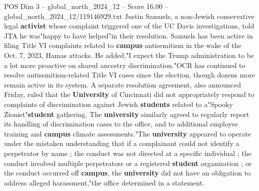 \begin{textsample}{POS Dim 3 – global\_north\_2024\_12 – Score 16.00 – global\_north\_2024\_12/119146929.txt}
Justin Samuels, a non-Jewish conservative legal \textbf{activist} whose complaint triggered one of the UC Davis investigations, told JTA he was"happy to have helped"in their resolution.
Samuels has been active in filing Title VI complaints related to \textbf{campus} antisemitism in the wake of the Oct. 7, 2023, Hamas attacks.
He added,"I expect the Trump administration to be a lot more proactive on shared ancestry discrimination."OCR has continued to resolve antisemitism-related Title VI cases since the election, though dozens more remain active in its system.
A separate resolution agreement, also announced Friday, ruled that the \textbf{University} of Cincinnati did not appropriately respond to complaints of discrimination against Jewish \textbf{students} related to a"Spooky Zionist"\textbf{student} gathering.
The \textbf{university} similarly agreed to regularly report its handling of discrimination cases to the office, and to additional employee training and \textbf{campus} climate assessments."The \textbf{university} appeared to operate under the mistaken understanding that if a complainant could not identify a perpetrator by name ; the conduct was not directed at a specific individual ; the conduct involved multiple perpetrators or a registered \textbf{student} organization ; or the conduct occurred off \textbf{campus}, the \textbf{university} did not have an obligation to address alleged harassment,"the office determined in a statement.

\end{textsample}

